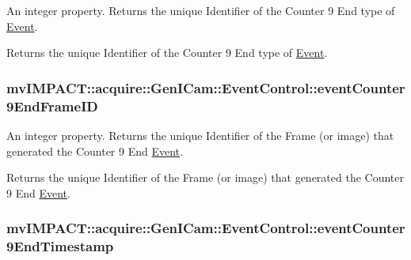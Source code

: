 An integer property. Returns the unique Identifier of the Counter 9 End type of \hyperlink{classmv_i_m_p_a_c_t_1_1acquire_1_1_event}{Event}. 

Returns the unique Identifier of the Counter 9 End type of \hyperlink{classmv_i_m_p_a_c_t_1_1acquire_1_1_event}{Event}. \hypertarget{classmv_i_m_p_a_c_t_1_1acquire_1_1_gen_i_cam_1_1_event_control_a425b880d8d2b39d835aba748a8fa5f2d}{
\subsubsection[{event\+Counter9\+End\+Frame\+I\+D}]{ mv\+I\+M\+P\+A\+C\+T\+::acquire\+::\+Gen\+I\+Cam\+::\+Event\+Control\+::event\+Counter9\+End\+Frame\+I\+D}}\label{classmv_i_m_p_a_c_t_1_1acquire_1_1_gen_i_cam_1_1_event_control_a425b880d8d2b39d835aba748a8fa5f2d}


An integer property. Returns the unique Identifier of the Frame (or image) that generated the Counter 9 End \hyperlink{classmv_i_m_p_a_c_t_1_1acquire_1_1_event}{Event}. 

Returns the unique Identifier of the Frame (or image) that generated the Counter 9 End \hyperlink{classmv_i_m_p_a_c_t_1_1acquire_1_1_event}{Event}. \hypertarget{classmv_i_m_p_a_c_t_1_1acquire_1_1_gen_i_cam_1_1_event_control_ab38fc4734afdb20ff0a3a76249e1d68e}{
\subsubsection[{event\+Counter9\+End\+Timestamp}]{ mv\+I\+M\+P\+A\+C\+T\+::acquire\+::\+Gen\+I\+Cam\+::\+Event\+Control\+::event\+Counter9\+End\+Timestamp}}\label{classmv_i_m_p_a_c_t_1_1acquire_1_1_gen_i_cam_1_1_event_control_ab38fc4734afdb20ff0a3a76249e1d68e}


